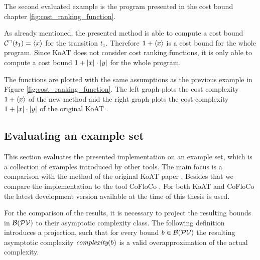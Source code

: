 \iffalse

\fi

The second evaluated example is the program presented in the cost bound chapter \ref{fig:cost_ranking_function}.



As already mentioned, the presented method is able to compute a cost bound ${\mathcal{C}^\sqcap}(t_1) = \langle x\rangle$ for the transition $t_1$.
Therefore $1 + \langle x\rangle$ is a cost bound for the whole program.
Since KoAT \cite{koat} does not consider cost ranking functions, it is only able to compute a cost bound $1 + \left|x\right| \cdot \left|y\right|$ for the whole program.

The functions are plotted with the same assumptions as the previous example in Figure \ref{fig:cost_ranking_function}.
The left graph plots the cost complexity $1 + \langle x\rangle$ of the new method and the right graph plots the cost complexity $1 + \left|x\right| \cdot \left|y\right|$ of the original KoAT \cite{koat}.

\iffalse

\fi

\subsection{Evaluating an example set}

This section evaluates the presented implementation on an example set, which is a collection of examples introduced by other tools.
The main focus is a comparison with the method of the original KoAT paper \cite{koat}.
Besides that we compare the implementation to the tool CoFloCo \cite{cofloco3}.
For both KoAT and CoFloCo the latest development version available at the time of this thesis is used.

For the comparison of the results, it is necessary to project the resulting bounds in $\mathcal{B}(\mathcal{PV})$ to their asymptotic complexity class.
The following definition introduces a projection, such that for every bound $b \in \mathcal{B}(\mathcal{PV})$ the resulting asymptotic complexity $\emph{complexity}(b)$ is a valid overapproximation of the actual complexity.

